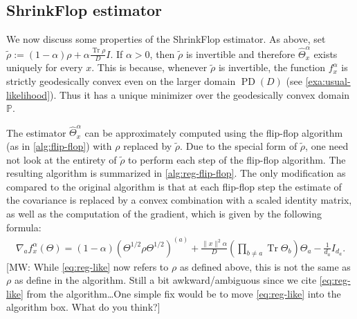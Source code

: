 \documentclass[aos]{imsart}
\theoremstyle{definition}
\numberwithin{equation}{section}
\DeclareMathOperator{\tr}{Tr}
\DeclareMathOperator{\PD}{PD}
\renewcommand{\P}{{\mathbb{P}}}
\newcommand{\otheta}{\overline{\Theta}}
\newcommand{\samp}{x}
\newcommand{\MW}[1]{{\color{red}[MW: #1]}}
\newcommand{\MW}[1]{{}}
\begin{document}
\subsection{ShrinkFlop estimator}
We now discuss some properties of the ShrinkFlop estimator. As above, set $\tilde{\rho} := (1- \alpha) \rho + \alpha \frac{\tr \rho}{D} I.$ If $\alpha > 0$, then $\tilde{\rho}$ is invertible and therefore $\widehat{\Theta}^\alpha_x$ exists uniquely for every $x$.
This is because, whenever $\tilde{\rho}$ is invertible, the function $f_{\samp}^\alpha$ is strictly geodesically convex even on the larger domain $\PD(D)$ (see \cref{exa:usual-likelihood}). Thus it has a unique minimizer over the geodesically convex domain $\P$.

The estimator $\widehat{\Theta}^\alpha_x$ can be approximately computed using the flip-flop algorithm (as in \cref{alg:flip-flop}) with $\rho$ replaced by $\tilde{\rho}$.
Due to the special form of $\tilde{\rho}$, one need not look at the entirety of $\tilde{\rho}$ to perform each step of the flip-flop algorithm.
The resulting algorithm is summarized in \cref{alg:reg-flip-flop}.
The only modification as compared to the original algorithm is that at each flip-flop step the estimate of the covariance is replaced by a convex combination with a scaled identity matrix, as well as the computation of the gradient, which is given by the following formula:
\begin{align}\nabla_a f^\alpha_\samp(\Theta) = (1 - \alpha) (\Theta^{1/2} \rho \Theta^{1/2})^{(a)} + \frac{\|x\|^2 \alpha}{D}  (\prod_{b \neq a} \tr \Theta_b ) \Theta_a - \frac{1}{d_a} I_{d_a}. \label{eq:reg-like}
\end{align}
\MW{While \cref{eq:reg-like} now refers to $\rho$ as defined above, this is not the same as $\rho$ as define in the algorithm. Still a bit awkward/ambiguous since we cite \cref{eq:reg-like} from the algorithm\dots One simple fix would be to move \cref{eq:reg-like} into the algorithm box. What do you think?}
\end{document}
